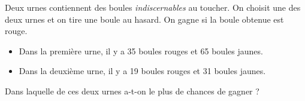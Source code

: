 Deux urnes contiennent des boules \emph{indiscernables} au toucher. On choisit une des deux urnes et on tire une boule au hasard. On gagne si la boule obtenue est rouge.
\begin{itemize}
    \item Dans la première urne, il y a 35 boules rouges et 65 boules jaunes.
    \item Dans la deuxième urne, il y a 19 boules rouges et 31 boules jaunes.
\end{itemize}
Dans laquelle de ces deux urnes a-t-on le plus de chances de gagner ?